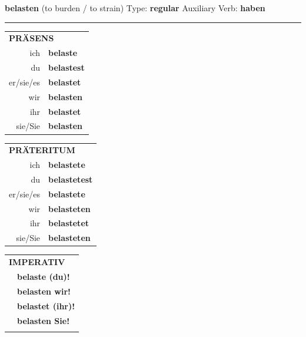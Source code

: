 \documentclass[10pt,a4paper]{revtex4-2}
\begin{document}
\begin{verbbox}
    {\Large \bf belasten} (to burden / to strain) \hfill Type: \textbf{regular} \hfill Auxiliary Verb: \textbf{haben} 
    
     \vspace{5pt}

    \hrule
    
    \vspace{5pt}

  \begin{tabular}{rl}
     \multicolumn{2}{l}{\textbf{PRÄSENS} }\\
    ich & \textbf{belaste}\\
    du & \textbf{belastest}\\
    er/sie/es & \textbf{belastet}\\
    wir & \textbf{belasten}\\
    ihr & \textbf{belastet}\\
    sie/Sie & \textbf{belasten}\\
  \end{tabular}
  \hfill
     \begin{tabular}{rl}
    \multicolumn{2}{l}{\textbf{PRÄTERITUM} }\\
    ich & \textbf{belastete}\\
    du & \textbf{belastetest}\\
    er/sie/es & \textbf{belastete}\\
    wir & \textbf{belasteten}\\
    ihr & \textbf{belastetet}\\
    sie/Sie & \textbf{belasteten}\\
  \end{tabular}
  \hfill
  \begin{tabular}{rl}
     \multicolumn{2}{l}{\textbf{IMPERATIV} }\\
   & \textbf{belaste (du)!}\\
   & \textbf{belasten wir!}\\
   & \textbf{belastet (ihr)!}\\
   & \textbf{belasten Sie!}\\
   & \vspace{10pt}
  \end{tabular}

    \vspace{10pt}


\end{verbbox}
\end{document}
